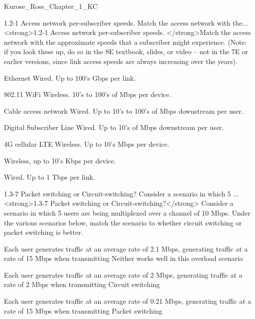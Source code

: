 \documentclass[a4paper,twocolumn]{article}
\begin{document}
\begin{quiz}{Kurose_Ross_Chapter_1_KC}
\begin{matching}[
	points=1,
	penalty=0.33333,
]{1.2-1 Access network per-subscriber speeds. Match the access network with the...}
<strong>1.2-1 Access network per-subscriber speeds. </strong>Match the access network with the approximate speeds that a subscriber might experience. (Note: if you look these up, do so in the 8E textbook, slides, or video -- not in the 7E or earlier versions, since link access speeds are always increasing over the years).
\item Ethernet \answer Wired. Up to 100's Gbps per link.
\item 802.11 WiFi \answer Wireless. 10’s to 100’s of Mbps per device.
\item Cable access network \answer Wired. Up to 10’s to 100’s of Mbps downstream per user.
\item Digital Subscriber Line \answer Wired. Up to 10’s of Mbps downstream per user.
\item 4G cellular LTE \answer Wireless. Up to 10’s Mbps per device.
\item \answer Wireless, up to 10's Kbps per device.
\item \answer Wired. Up to 1 Tbps per link.
\end{matching}

\begin{matching}[
	points=1,
	penalty=0.33333,
]{1.3-7 Packet switching or Circuit-switching? Consider a scenario in which 5 ...}
<strong>1.3-7 Packet switching or Circuit-switching?</strong> Consider a scenario in which 5 users are being multiplexed over a channel of 10 Mbps.  Under the various scenarios below, match the scenario to whether circuit switching or packet switching is better.
\item Each user generates traffic at an average rate of 2.1 Mbps, generating traffic at a rate of 15 Mbps when transmitting \answer Neither works well in this overload scenario
\item Each user generates traffic at an average rate of 2 Mbps, generating traffic at a rate of 2 Mbps when transmitting \answer Circuit switching
\item Each user generates traffic at an average rate of 0.21 Mbps, generating traffic at a rate of 15 Mbps when transmitting \answer Packet switching
\end{matching}


\end{quiz}
\end{document}
